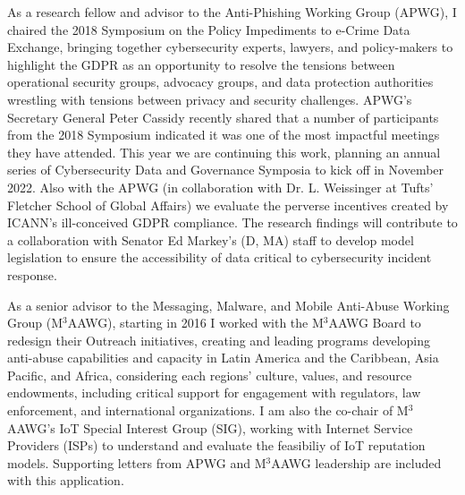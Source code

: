 \documentclass[11pt]{letter}
\begin{document}
\begin{letter}
%
%
As a research fellow and advisor to the Anti-Phishing Working Group (APWG), I chaired the 2018 Symposium on the Policy Impediments to e-Crime Data Exchange, bringing together cybersecurity experts,
lawyers, and policy-makers to highlight the GDPR as an opportunity to resolve the tensions between operational security groups, advocacy groups, and data protection authorities wrestling with tensions between privacy and security challenges.
%
APWG's Secretary General Peter Cassidy recently shared that a number of participants from the 2018 Symposium indicated it was one of the most impactful meetings they have attended.
%
This year we are continuing this work, planning an annual series of Cybersecurity Data and Governance Symposia to kick off in November 2022.
%
Also with the APWG (in collaboration with Dr. L. Weissinger at Tufts' Fletcher School of Global Affairs) we evaluate the perverse incentives created by ICANN's ill-conceived GDPR compliance.
%
The research findings will contribute to a collaboration with Senator Ed Markey's (D, MA) staff to develop model legislation to ensure the accessibility of data critical to cybersecurity incident response. 

%
As a senior advisor to the Messaging, Malware, and Mobile Anti-Abuse Working Group (M$^3$AAWG), starting in 2016 I worked with the M$^3$AAWG Board to redesign their Outreach initiatives, creating and leading 
programs developing anti-abuse capabilities and capacity in Latin America and the Caribbean, Asia Pacific, and Africa, considering each regions' culture, values, and resource endowments, including critical support for engagement with regulators, law enforcement, and international organizations.
%
I am also the co-chair of M$^3$AAWG's IoT Special Interest Group (SIG), working with Internet Service Providers (ISPs) to understand and evaluate the feasibiliy of IoT reputation models.
%
Supporting letters from APWG and M$^3$AAWG leadership are included with this application.


\end{letter}
\end{document}
